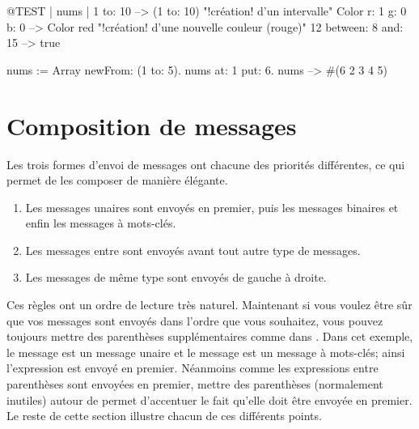 \documentclass[a4paper,10pt,twoside]{book}
\begin{document}
\begin{code}{@TEST | nums |}
1 to: 10                        --> (1 to: 10)  "!création! d'un intervalle"
Color r: 1 g: 0 b: 0       --> Color red  "!création! d'une nouvelle
couleur (rouge)"
12 between: 8 and: 15 --> true

nums := Array newFrom: (1 to: 5).
nums at: 1 put: 6.
nums --> #(6 2 3 4 5)
\end{code}


\section{Composition de messages}
Les trois formes d'envoi de messages ont chacune des priorités différentes, ce qui permet de les composer de manière élégante.

\begin{enumerate}
\item Les messages unaires sont envoyés en premier, puis les messages binaires et enfin les messages à mots-clés.
\item Les messages entre  sont envoyés avant tout autre type de messages. 
\item Les messages de même type sont envoyés de gauche à droite. 
\end{enumerate}

Ces règles ont un ordre de lecture très naturel. Maintenant si
vous voulez être sûr que vos messages sont envoyés dans l'ordre
que vous souhaitez, vous pouvez toujours mettre des parenthèses
supplémentaires comme dans . Dans cet exemple, le
message  est un message unaire et le message 
est un message à mots-clés; ainsi l'expression 
est envoyé en premier. Néanmoins comme les expressions entre
parenthèses sont envoyées en premier, mettre des parenthèses
(normalement inutiles) autour de  permet d'accentuer
le fait qu'elle
doit être envoyée en premier. Le reste de cette section illustre
chacun de ces différents points.
\end{document}

